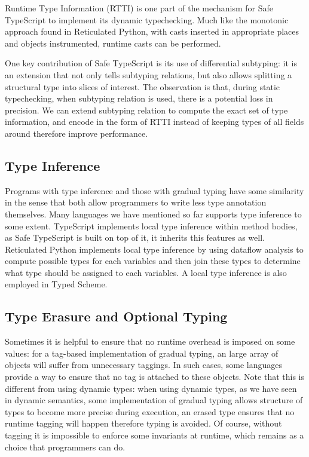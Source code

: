 Runtime Type Information (RTTI) is one part of the mechanism for Safe TypeScript
to implement its dynamic typechecking. Much like the monotonic approach found in Reticulated Python,
with casts inserted in appropriate places and objects instrumented, runtime casts can be performed.

One key contribution of Safe TypeScript is its use of differential subtyping:
it is an extension that not only tells subtyping relations, but also allows splitting
a structural type into slices of interest.
The observation is that, during static typechecking, when subtyping relation is used, there is a potential loss in precision. We can extend subtyping relation to compute the exact set of type information,
and encode in the form of RTTI instead of keeping types of all fields around therefore improve performance.

\subsection{Type Inference}

Programs with type inference and those with gradual typing have some similarity in the sense
that both allow programmers to write less type annotation themselves.
Many languages we have mentioned so far supports type inference to some extent.
TypeScript implements local type inference within method bodies,
as Safe TypeScript is built on top of it, it inherits this features as well.
Reticulated Python implements local type inference by
using dataflow analysis to compute possible types for each variables
and then join these types to determine what type should be assigned to each variables.
A local type inference is also employed in Typed Scheme.

\subsection{Type Erasure and Optional Typing}

Sometimes it is helpful to ensure that no runtime overhead is imposed
on some values: for a tag-based implementation of gradual typing,
an large array of objects will suffer from unnecessary taggings.
In such cases, some languages provide a way to ensure that no tag is attached
to these objects.
Note that this is different from using dynamic types:
when using dynamic types, as we have seen in dynamic semantics,
some implementation of gradual typing allows structure of types to become more precise
during execution, an erased type ensures that no runtime tagging will happen
therefore typing is avoided.
Of course, without tagging it is impossible to enforce some invariants at runtime,
which remains as a choice that programmers can do.

